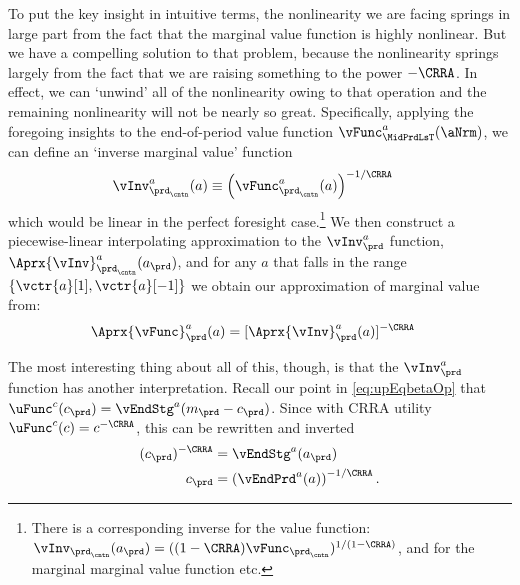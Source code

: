 \documentclass[\econtexRoot/SolvingMicroDSOPs]{subfiles}
\begin{document}
To put the key insight in intuitive terms, the nonlinearity we are facing springs in large part from the fact that the marginal value function is highly nonlinear.  But we have a compelling solution to that problem, because the nonlinearity springs largely from the fact that we are raising something to the power $-\CRRA$.  In effect, we can `unwind' all of the nonlinearity owing to that operation and the remaining nonlinearity will not be nearly so great.  Specifically, applying the foregoing insights to the end-of-period value function $\vFunc^{a}_{\MidPrdLsT}(\aNrm)$, we can define an `inverse marginal value' function
\begin{equation}\begin{gathered}\begin{aligned}
      \vInv_{\prd_\cntn}^{a}(a)  & \equiv  \left(\vFunc^{a}_{\prd_\cntn}(a)\right)^{-1/\CRRA} \label{eq:cGoth}
    \end{aligned}\end{gathered}\end{equation}
which would be linear in the perfect foresight case.\footnote{There is a corresponding inverse for the value function: $\vInv_{\prd_\cntn}(a_{\prd})=((1-\CRRA)\vFunc_{\prd_\cntn})^{1/(1-\CRRA)}$, and for the marginal marginal value function etc.}  We then construct a piecewise-linear interpolating approximation to the $\vInv_{\prd}^{a}$ function, $\Aprx{\vInv}_{\prd_\cntn}^{a}(a_{\prd})$, and for any $a$ that falls in the range $\{\vctr{a}[1],\vctr{a}[-1]\}$ we obtain our approximation of marginal value from:
\begin{equation}\begin{gathered}\begin{aligned}
      \Aprx{\vFunc}_{\prd}^{a}(a) & =
      [\Aprx{\vInv}_{\prd}^{a}(a)]^{-\CRRA}
    \end{aligned}\end{gathered}\end{equation}

The most interesting thing about all of this, though, is that the $\vInv^{a}_{\prd}$ function has another interpretation. Recall our point in \eqref{eq:upEqbetaOp} that $\uFunc^{c}(c_{\prd}) = \vEndStg^{a}(m_{\prd}-c_{\prd})$.  Since with CRRA utility $\uFunc^{c}(c)=c^{-\CRRA}$, this can be rewritten
and inverted
\begin{equation}\begin{gathered}\begin{aligned}
      (c_{\prd})^{-\CRRA} & = \vEndStg^{a}(a_{\prd})
      \\ c_{\prd} & =      \left(\vEndPrd^{a}(a)\right)^{-1/\CRRA}.
    \end{aligned}\end{gathered}\end{equation}
\end{document}
